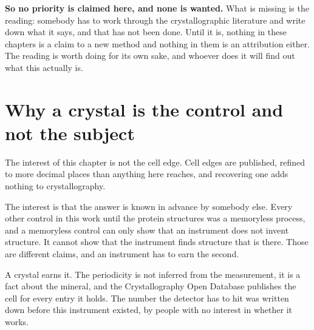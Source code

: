 \textbf{So no priority is claimed here, and none is wanted.} What is missing is the reading: somebody has to work through the crystallographic literature and write down what it says, and that has not been done. Until it is, nothing in these chapters is a claim to a new method and nothing in them is an attribution either. The reading is worth doing for its own sake, and whoever does it will find out what this actually is.

\section{Why a crystal is the control and not the subject}

The interest of this chapter is not the cell edge. Cell edges are published, refined to more decimal places than anything here reaches, and recovering one adds nothing to crystallography.

The interest is that the answer is known in advance by somebody else. Every other control in this work until the protein structures was a memoryless process, and a memoryless control can only show that an instrument does not invent structure. It cannot show that the instrument finds structure that is there. Those are different claims, and an instrument has to earn the second.

A crystal earns it. The periodicity is not inferred from the measurement, it is a fact about the mineral, and the Crystallography Open Database publishes the cell for every entry it holds. The number the detector has to hit was written down before this instrument existed, by people with no interest in whether it works.
